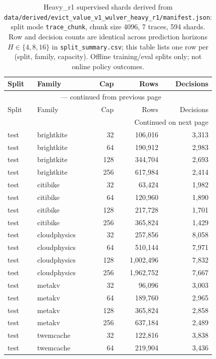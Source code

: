 \begin{longtable}{llrrr}
\caption{Heavy\_r1 supervised shards derived from \texttt{data/derived/evict\_value\_v1\_wulver\_heavy\_r1/manifest.json}: split mode \texttt{trace\_chunk}, chunk size 4096, 7 traces, 594 shards. Row and decision counts are identical across prediction horizons $H \in \{4,8,16\}$ in \texttt{split\_summary.csv}; this table lists one row per (split, family, capacity). Offline training/eval splits only; not online policy outcomes.}\label{tab:pre-eval-dataset-heavy-r1}\\
\toprule
Split & Family & Cap & Rows & Decisions \\
\midrule
\endfirsthead
\multicolumn{5}{c}{{\tablename\ \thetable{} --- continued from previous page}} \\
\toprule
Split & Family & Cap & Rows & Decisions \\
\midrule
\endhead
\midrule
\multicolumn{5}{r}{{Continued on next page}} \\
\endfoot
\bottomrule
\endlastfoot
test & brightkite & 32 & 106,016 & 3,313 \\
test & brightkite & 64 & 190,912 & 2,983 \\
test & brightkite & 128 & 344,704 & 2,693 \\
test & brightkite & 256 & 617,984 & 2,414 \\
test & citibike & 32 & 63,424 & 1,982 \\
test & citibike & 64 & 120,960 & 1,890 \\
test & citibike & 128 & 217,728 & 1,701 \\
test & citibike & 256 & 365,824 & 1,429 \\
test & cloudphysics & 32 & 257,856 & 8,058 \\
test & cloudphysics & 64 & 510,144 & 7,971 \\
test & cloudphysics & 128 & 1,002,496 & 7,832 \\
test & cloudphysics & 256 & 1,962,752 & 7,667 \\
test & metakv & 32 & 96,096 & 3,003 \\
test & metakv & 64 & 189,760 & 2,965 \\
test & metakv & 128 & 365,824 & 2,858 \\
test & metakv & 256 & 637,184 & 2,489 \\
test & twemcache & 32 & 122,816 & 3,838 \\
test & twemcache & 64 & 219,904 & 3,436 \\

\end{longtable}
